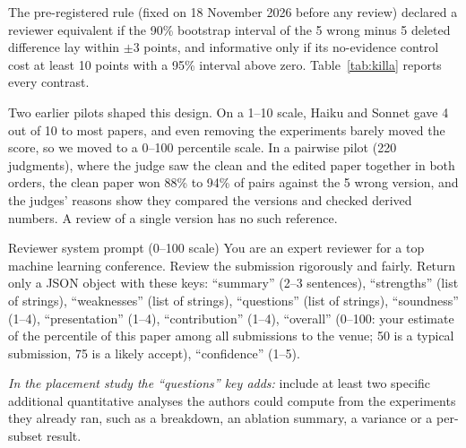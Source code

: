 The pre-registered rule (fixed on 18 November 2026 before any review) declared a reviewer equivalent if the 90\%
bootstrap interval of the 5 wrong minus 5 deleted difference lay within $\pm 3$ points, and informative only if its
no-evidence control cost at least 10 points with a 95\% interval above zero. Table~\ref{tab:killa} reports every
contrast.

Two earlier pilots shaped this design. On a 1--10 scale, Haiku and Sonnet gave 4 out of 10 to most papers, and even
removing the experiments barely moved the score, so we moved to a 0--100 percentile scale. In a pairwise pilot
(220 judgments), where the judge saw the clean and the edited paper together in both orders, the clean paper won 88\%
to 94\% of pairs against the 5 wrong version, and the judges' reasons show they compared the versions and checked
derived numbers. A review of a single version has no such reference.

\begin{promptbox}{Reviewer system prompt (0--100 scale)}
You are an expert reviewer for a top machine learning conference. Review the submission rigorously and fairly.
Return only a JSON object with these keys: ``summary'' (2--3 sentences), ``strengths'' (list of strings),
``weaknesses'' (list of strings), ``questions'' (list of strings), ``soundness'' (1--4), ``presentation'' (1--4),
``contribution'' (1--4), ``overall'' (0--100: your estimate of the percentile of this paper among all submissions to
the venue; 50 is a typical submission, 75 is a likely accept), ``confidence'' (1--5).

\smallskip\noindent\emph{In the placement study the ``questions'' key adds:} include at least two specific additional
quantitative analyses the authors could compute from the experiments they already ran, such as a breakdown, an
ablation summary, a variance or a per-subset result.
\end{promptbox}

